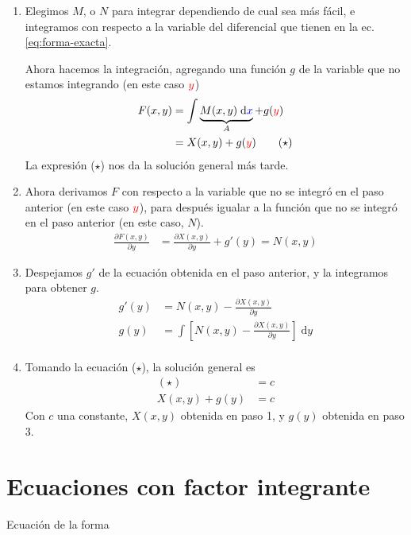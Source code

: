 \documentclass[a4paper]{article}
\newcommand{\dif}[1]{\;\mathrm{d}#1}
\begin{document}
\begin{enumerate}
    \item Elegimos $M$, o $N$ para integrar dependiendo de cual sea más fácil, e integramos con respecto a la variable del diferencial que tienen en la ec. \eqref{eq:forma-exacta}.

    Ahora hacemos la integración, agregando una función $g$ de la variable que no estamos integrando (en este caso ${\color{red} y}$)
    \begin{align*}
        F(x,y) &= \int \underbrace{M(x,y) \dif{{\color{blue}x}}}_{A} + g({\color{red}y}) \\
        &= X(x,y) + g({\color{red}y}) \tag{$\star$}
    \end{align*}
    La expresión ($\star$) nos da la solución general más tarde.

    \item Ahora derivamos $F$ con respecto a la variable que no se integró en el paso anterior (en este caso ${\color{red} y}$), para después igualar a la función que no se integró en el paso anterior (en este caso, $N$).
    \begin{align*}
        \frac{\partial F(x,y)}{\partial y} &= \frac{\partial X(x,y)}{\partial y} + g'(y) = N(x,y)
    \end{align*}

    \item Despejamos $g'$ de la ecuación obtenida en el paso anterior, y la integramos para obtener $g$.
    \begin{align*}
        g'(y) &= N(x,y) - \frac{\partial X(x,y)}{\partial y} \\
        g(y) &= \int \left[ N(x,y) - \frac{\partial X(x,y)}{\partial y}  \right] \dif{y} \\
    \end{align*}

    \item
    Tomando la ecuación ($\star$), la solución general es
    \begin{align*}
        (\star) &= c \\
        X(x,y) + g(y) &= c
    \end{align*}
    Con $c$ una constante, $X(x,y)$ obtenida en paso 1, y $g(y)$ obtenida en paso 3.
\end{enumerate}


\section{Ecuaciones con factor integrante}
Ecuación de la forma
\end{document}
